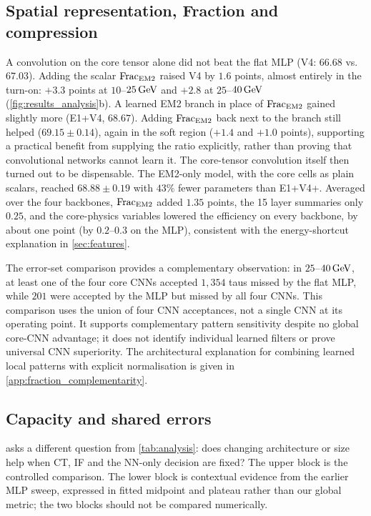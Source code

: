 \subsection{Spatial representation, Fraction and compression}
\label{app:analysis_representation}
A convolution on the core tensor alone did not beat the flat MLP (V4: $66.68$ vs.\ $67.03$). Adding the scalar $\mathrm{Frac}_{\mathrm{EM2}}$ raised V4 by $1.6$ points, almost entirely in the turn-on: $+3.3$ points at $10$--$25\,\mathrm{GeV}$ and $+2.8$ at $25$--$40\,\mathrm{GeV}$ (\cref{fig:results_analysis}b). A learned EM2 branch in place of $\mathrm{Frac}_{\mathrm{EM2}}$ gained slightly more (E1+V4, $68.67$). Adding $\mathrm{Frac}_{\mathrm{EM2}}$ back next to the branch still helped ($69.15\pm0.14$), again in the soft region ($+1.4$ and $+1.0$ points), supporting a practical benefit from supplying the ratio explicitly, rather than proving that convolutional networks cannot learn it. The core-tensor convolution itself then turned out to be dispensable. The EM2-only model, with the core cells as plain scalars, reached $68.88\pm0.19$ with $43\%$ fewer parameters than E1+V4+\Ffeat. Averaged over the four backbones, $\mathrm{Frac}_{\mathrm{EM2}}$ added $1.35$ points, the 15 layer summaries only $0.25$, and the core-physics variables lowered the efficiency on every backbone, by about one point (by $0.2$--$0.3$ on the MLP), consistent with the energy-shortcut explanation in \cref{sec:features}.

The error-set comparison provides a complementary observation: in $25$--$40\,\mathrm{GeV}$, at least one of the four core CNNs accepted $1{,}354$ taus missed by the flat MLP, while $201$ were accepted by the MLP but missed by all four CNNs. This comparison uses the union of four CNN acceptances, not a single CNN at its operating point. It supports complementary pattern sensitivity despite no global core-CNN advantage; it does not identify individual learned filters or prove universal CNN superiority. The architectural explanation for combining learned local patterns with explicit normalisation is given in \cref{app:fraction_complementarity}.

\subsection{Capacity and shared errors}
\label{app:analysis_capacity}
 asks a different question from \cref{tab:analysis}: does changing architecture or size help when CT, IF and the NN-only decision are fixed? The upper block is the controlled comparison. The lower block is contextual evidence from the earlier MLP sweep, expressed in fitted midpoint and plateau rather than our global metric; the two blocks should not be compared numerically.

